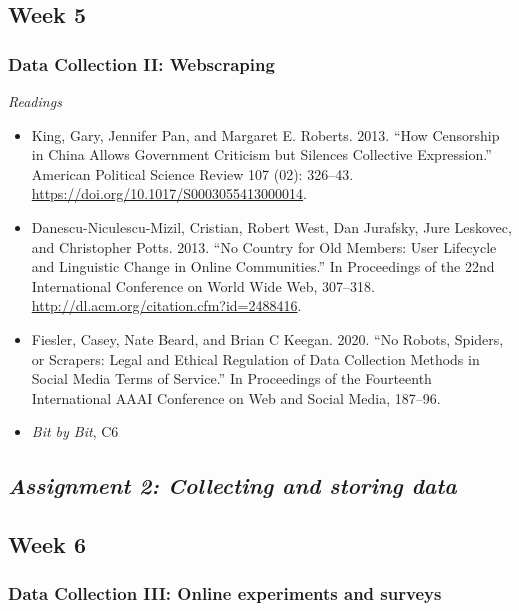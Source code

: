 \documentclass[
  10pt,
]{article}
\providecommand{\tightlist}{%
  \setlength{\itemsep}{0pt}\setlength{\parskip}{0pt}}
\begin{document}
\hypertarget{week-5}{%
\subsection{Week 5}\label{week-5}}

\hypertarget{data-collection-ii-webscraping}{%
\subsubsection{Data Collection II:
Webscraping}\label{data-collection-ii-webscraping}}

\emph{Readings}

\begin{itemize}
\tightlist
\item
  King, Gary, Jennifer Pan, and Margaret E. Roberts. 2013. ``How
  Censorship in China Allows Government Criticism but Silences
  Collective Expression.'' American Political Science Review 107 (02):
  326--43. \url{https://doi.org/10.1017/S0003055413000014}.
\item
  Danescu-Niculescu-Mizil, Cristian, Robert West, Dan Jurafsky, Jure
  Leskovec, and Christopher Potts. 2013. ``No Country for Old Members:
  User Lifecycle and Linguistic Change in Online Communities.'' In
  Proceedings of the 22nd International Conference on World Wide Web,
  307--318. \url{http://dl.acm.org/citation.cfm?id=2488416}.
\item
  Fiesler, Casey, Nate Beard, and Brian C Keegan. 2020. ``No Robots,
  Spiders, or Scrapers: Legal and Ethical Regulation of Data Collection
  Methods in Social Media Terms of Service.'' In Proceedings of the
  Fourteenth International AAAI Conference on Web and Social Media,
  187--96.
\item
  \emph{Bit by Bit}, C6
\end{itemize}

\hypertarget{assignment-2-collecting-and-storing-data}{%
\subsection{\texorpdfstring{\emph{Assignment 2: Collecting and storing
data}}{Assignment 2: Collecting and storing data}}\label{assignment-2-collecting-and-storing-data}}

\hypertarget{week-6}{%
\subsection{Week 6}\label{week-6}}

\hypertarget{data-collection-iii-online-experiments-and-surveys}{%
\subsubsection{Data Collection III: Online experiments and
surveys}\label{data-collection-iii-online-experiments-and-surveys}}
\end{document}
